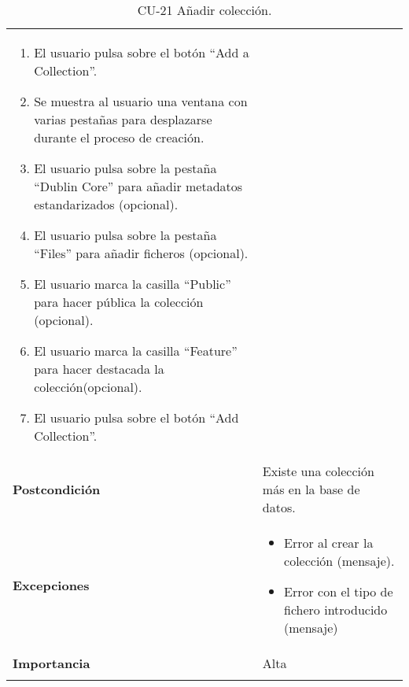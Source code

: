 \begin{longtable}[]{@{}ll@{}}
\begin{minipage}[t]{0.76\columnwidth}
\begin{enumerate}
\tightlist
\item
  El usuario pulsa sobre el botón ``Add a Collection''.
\item
  Se muestra al usuario una ventana con varias pestañas para desplazarse
  durante el proceso de creación.
\item
  El usuario pulsa sobre la pestaña ``Dublin Core'' para añadir metadatos
  estandarizados (opcional).
\item
  El usuario pulsa sobre la pestaña ``Files'' para añadir ficheros
  (opcional).
\item
  El usuario marca la casilla ``Public'' para hacer pública la colección
  (opcional).
\item
  El usuario marca la casilla ``Feature'' para hacer destacada la
  colección(opcional).
\item
  El usuario pulsa sobre el botón ``Add Collection''.
\end{enumerate}\strut
\end{minipage}\tabularnewline
\begin{minipage}[t]{0.18\columnwidth}\raggedright
\textbf{Postcondición}\strut
\end{minipage} & \begin{minipage}[t]{0.76\columnwidth}\raggedright
Existe una colección más en la base de datos.\strut
\end{minipage}\tabularnewline
\begin{minipage}[t]{0.18\columnwidth}\raggedright
\textbf{Excepciones}\strut
\end{minipage} & \begin{minipage}[t]{0.76\columnwidth}\raggedright
\begin{itemize}
\tightlist
\item
  Error al crear la colección (mensaje).
\item
  Error con el tipo de fichero introducido (mensaje)
\end{itemize}\strut
\end{minipage}\tabularnewline
\begin{minipage}[t]{0.18\columnwidth}\raggedright
\textbf{Importancia}\strut
\end{minipage} & \begin{minipage}[t]{0.76\columnwidth}\raggedright
Alta\strut
\end{minipage}\tabularnewline
\bottomrule
\caption{CU-21 Añadir colección.}
\end{longtable}

